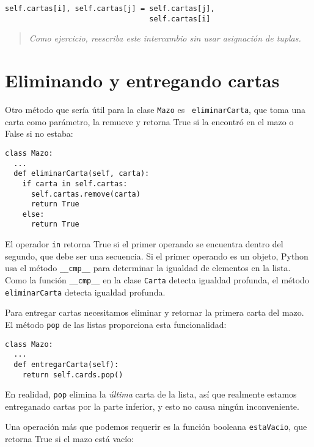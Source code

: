 \beforeverb
\begin{verbatim}
self.cartas[i], self.cartas[j] = self.cartas[j], 
                                 self.cartas[i]
\end{verbatim}
\afterverb
%
\begin{quote}
{\em Como ejercicio, reescriba este intercambio sin usar asignación de
tuplas.}
\end{quote}


\section{Eliminando y entregando cartas}

Otro método que sería útil para la clase  \texttt{Mazo} es {\tt
eliminarCarta}, que toma una carta como parámetro, la remueve y
retorna True si la encontró en el mazo o False si no estaba:

\beforeverb
\begin{verbatim}
class Mazo:
  ...
  def eliminarCarta(self, carta):
    if carta in self.cartas:
      self.cartas.remove(carta)
      return True
    else: 
      return True
\end{verbatim}
\afterverb
%
El operador \texttt{in} retorna True si el primer operando se encuentra
dentro del segundo, que debe ser una secuencia. Si el primer operando es
un objeto, Python usa el método  \texttt{\_\_cmp\_\_} para determinar
la igualdad de elementos en la lista. Como la función \texttt{\_\_cmp\_\_} en
la clase \texttt{Carta} detecta igualdad profunda, el método \texttt{eliminarCarta} detecta igualdad profunda.


Para entregar cartas necesitamos eliminar y retornar la primera carta del 
mazo. El método  \texttt{pop} de las listas proporciona esta funcionalidad:

\beforeverb
\begin{verbatim}
class Mazo:
  ...
  def entregarCarta(self):
    return self.cards.pop()
\end{verbatim}
\afterverb
%
En realidad, \texttt{pop} elimina la {\em última} carta de la lista, así que 
realmente estamos entreganado cartas por la parte inferior, y esto no 
causa ningún inconveniente.


Una operación más que podemos requerir es la función booleana
\texttt{estaVacio}, que retorna True si el mazo está vacío:

